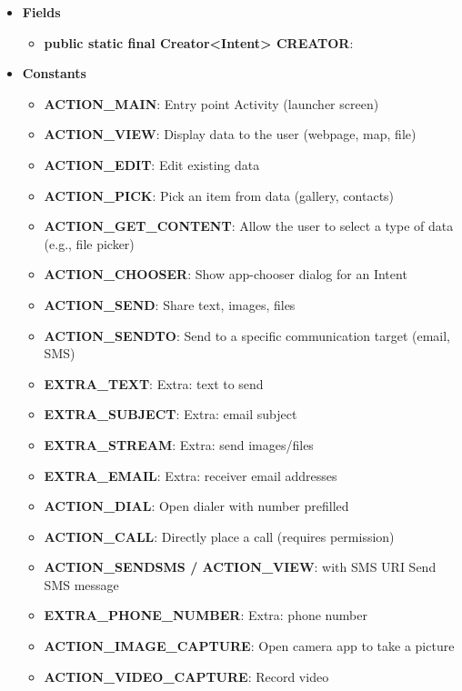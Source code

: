 \documentclass{report}
\begin{document}
\begin{itemize}
        \item \textbf{Fields}
            \begin{itemize}
                \item \textbf{public static final Creator<Intent> CREATOR}:
            \end{itemize}
        \item \textbf{Constants}
            \begin{itemize}
                \item \textbf{ACTION\_MAIN}:	Entry point Activity (launcher screen)
                \item \textbf{ACTION\_VIEW}:	Display data to the user (webpage, map, file)
                \item \textbf{ACTION\_EDIT}:	Edit existing data
                \item \textbf{ACTION\_PICK}:	Pick an item from data (gallery, contacts)
                \item \textbf{ACTION\_GET\_CONTENT}:	Allow the user to select a type of data (e.g., file picker)
                \item \textbf{ACTION\_CHOOSER}:	Show app-chooser dialog for an Intent
                \item \textbf{ACTION\_SEND}:	Share text, images, files
                \item \textbf{ACTION\_SENDTO}:	Send to a specific communication target (email, SMS)
                \item \textbf{EXTRA\_TEXT}:	Extra: text to send
                \item \textbf{EXTRA\_SUBJECT}:	Extra: email subject
                \item \textbf{EXTRA\_STREAM}:	Extra: send images/files
                \item \textbf{EXTRA\_EMAIL}:	Extra: receiver email addresses
                \item \textbf{ACTION\_DIAL}:	Open dialer with number prefilled
                \item \textbf{ACTION\_CALL}:	Directly place a call (requires permission)
                \item \textbf{ACTION\_SENDSMS / ACTION\_VIEW}: with SMS URI	Send SMS message
                \item \textbf{EXTRA\_PHONE\_NUMBER}:	Extra: phone number
                \item \textbf{ACTION\_IMAGE\_CAPTURE}:	Open camera app to take a picture
                \item \textbf{ACTION\_VIDEO\_CAPTURE}:	Record video

\end{itemize}
\end{itemize}
\end{document}
